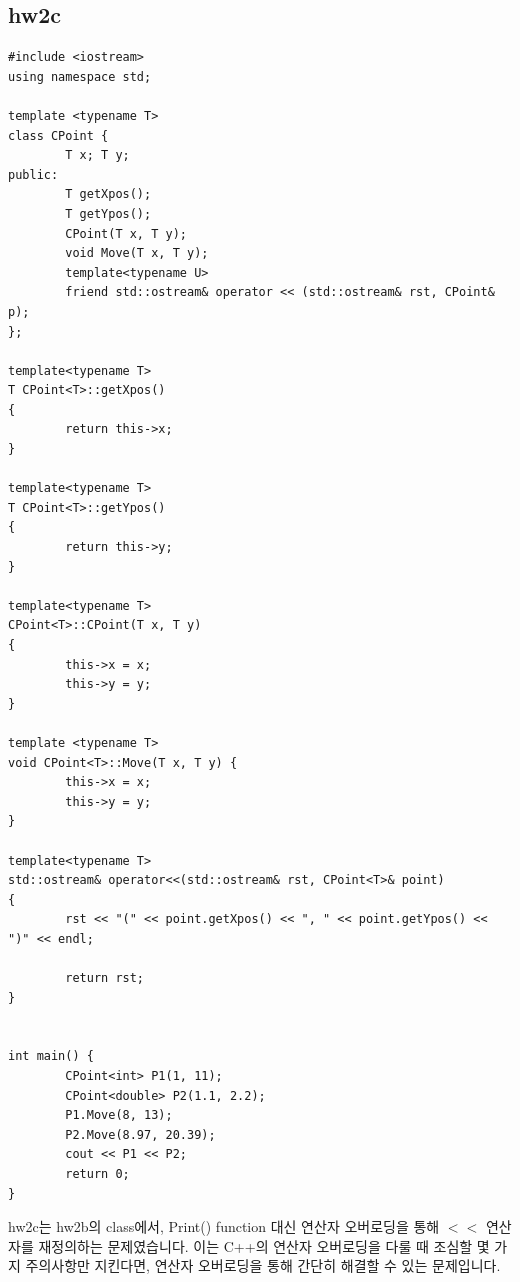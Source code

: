 \documentclass{article}
\begin{document}
\subsection{hw2c}
\begin{verbatim}
#include <iostream>
using namespace std;

template <typename T>
class CPoint {
    	T x; T y;
public:
    	T getXpos();
    	T getYpos();
    	CPoint(T x, T y);
    	void Move(T x, T y);
    	template<typename U>
    	friend std::ostream& operator << (std::ostream& rst, CPoint& p);
};

template<typename T>
T CPoint<T>::getXpos()
{
    	return this->x;
}

template<typename T>
T CPoint<T>::getYpos()
{
	    return this->y; 
}

template<typename T>
CPoint<T>::CPoint(T x, T y)
{
    	this->x = x;
    	this->y = y;
}

template <typename T>
void CPoint<T>::Move(T x, T y) {
    	this->x = x;
    	this->y = y;
}

template<typename T>
std::ostream& operator<<(std::ostream& rst, CPoint<T>& point)
{
    	rst << "(" << point.getXpos() << ", " << point.getYpos() << ")" << endl;
    
    	return rst;
}


int main() {
    	CPoint<int> P1(1, 11);
    	CPoint<double> P2(1.1, 2.2);
    	P1.Move(8, 13);
    	P2.Move(8.97, 20.39);
    	cout << P1 << P2;
    	return 0;
}

\end{verbatim}
hw2c는 hw2b의 class에서, Print() function 대신 연산자 오버로딩을 통해 $<<$ 연산자를 재정의하는 문제였습니다. 이는 C++의 연산자 오버로딩을 다룰 때 조심할 몇 가지 주의사항만 지킨다면, 연산자 오버로딩을 통해 간단히 해결할 수 있는 문제입니다.
\end{document}

